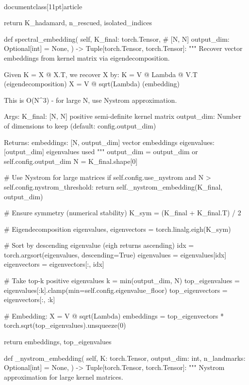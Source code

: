 \\documentclass[11pt]{article}
\begin{document}
\begin{CodeBlock}
        return K_hadamard, n_rescued, isolated_indices

    def spectral_embedding(
        self,
        K_final: torch.Tensor,  # [N, N]
        output_dim: Optional[int] = None,
    ) -> Tuple[torch.Tensor, torch.Tensor]:
        """
        Recover vector embeddings from kernel matrix via eigendecomposition.

        Given K = X @ X.T, we recover X by:
            K = V @ Lambda @ V.T  (eigendecomposition)
            X = V @ sqrt(Lambda)  (embedding)

        This is O(N^3) - for large N, use Nystrom approximation.

        Args:
            K_final: [N, N] positive semi-definite kernel matrix
            output_dim: Number of dimensions to keep (default: config.output_dim)

        Returns:
            embeddings: [N, output_dim] vector embeddings
            eigenvalues: [output_dim] eigenvalues used
        """
        output_dim = output_dim or self.config.output_dim
        N = K_final.shape[0]

        # Use Nystrom for large matrices
        if self.config.use_nystrom and N > self.config.nystrom_threshold:
            return self._nystrom_embedding(K_final, output_dim)

        # Ensure symmetry (numerical stability)
        K_sym = (K_final + K_final.T) / 2

        # Eigendecomposition
        eigenvalues, eigenvectors = torch.linalg.eigh(K_sym)

        # Sort by descending eigenvalue (eigh returns ascending)
        idx = torch.argsort(eigenvalues, descending=True)
        eigenvalues = eigenvalues[idx]
        eigenvectors = eigenvectors[:, idx]

        # Take top-k positive eigenvalues
        k = min(output_dim, N)
        top_eigenvalues = eigenvalues[:k].clamp(min=self.config.eigenvalue_floor)
        top_eigenvectors = eigenvectors[:, :k]

        # Embedding: X = V @ sqrt(Lambda)
        embeddings = top_eigenvectors * torch.sqrt(top_eigenvalues).unsqueeze(0)

        return embeddings, top_eigenvalues

    def _nystrom_embedding(
        self,
        K: torch.Tensor,
        output_dim: int,
        n_landmarks: Optional[int] = None,
    ) -> Tuple[torch.Tensor, torch.Tensor]:
        """
        Nystrom approximation for large kernel matrices.


\end{CodeBlock}
\end{document}
